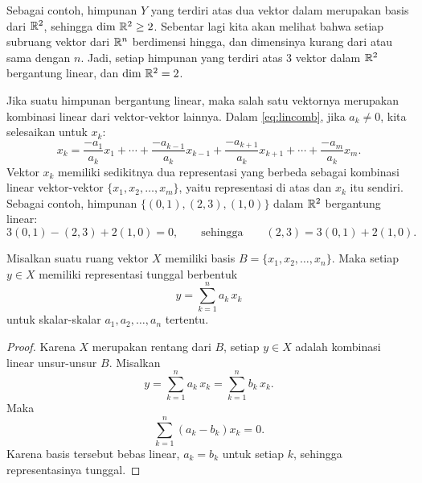 Sebagai contoh,
himpunan $Y$ yang terdiri atas dua vektor dalam
 merupakan basis dari ${\mathbb{R}}^2$, sehingga
$\dim \, {\mathbb{R}}^2 \geq 2$.
Sebentar lagi kita akan melihat bahwa setiap subruang vektor dari ${\mathbb{R}}^n$
berdimensi hingga, dan dimensinya kurang dari atau sama dengan $n$.
Jadi, setiap himpunan yang terdiri atas 3 vektor dalam ${\mathbb{R}}^2$ bergantung linear, dan
$\dim \, {\mathbb{R}}^2 = 2$.

Jika suatu himpunan bergantung linear, maka salah satu
vektornya merupakan kombinasi linear dari vektor-vektor lainnya.
Dalam \eqref{eq:lincomb},
jika $a_k \neq 0$, kita selesaikan untuk $x_k$:
\begin{equation*}
x_k = \frac{-a_1}{a_k} x_1 + \cdots + 
\frac{-a_{k-1}}{a_k} x_{k-1} +
\frac{-a_{k+1}}{a_k} x_{k+1} +
\cdots + 
\frac{-a_m}{a_k} x_m .
\end{equation*}
Vektor $x_k$ memiliki sedikitnya dua representasi yang berbeda
sebagai kombinasi linear vektor-vektor $\{ x_1,x_2,\ldots,x_m \}$, yaitu representasi di atas dan
$x_k$ itu sendiri. 
Sebagai contoh, himpunan $\bigl\{ (0,1), (2,3), (1,0) \bigr\}$ dalam ${\mathbb{R}}^2$ bergantung linear:
\begin{equation*}
3(0,1) - (2,3) + 2(1,0) = 0 ,
\qquad \text{sehingga} \qquad
(2,3) = 3(0,1) + 2(1,0) .
\end{equation*}

\begin{prop}
Misalkan suatu ruang vektor $X$ memiliki basis 
$B = \{ x_1, x_2, \ldots, x_n \}$.  Maka
setiap $y \in X$ memiliki representasi tunggal berbentuk
\begin{equation*}
y = \sum_{k=1}^n a_k \, x_k
\end{equation*}
untuk skalar-skalar $a_1, a_2, \ldots, a_n$ tertentu.
\end{prop}

\begin{proof}
Karena $X$ merupakan rentang dari $B$,
setiap $y \in X$ adalah kombinasi linear unsur-unsur $B$.
Misalkan
\begin{equation*}
y = \sum_{k=1}^n a_k \, x_k = \sum_{k=1}^n b_k \, x_k .
\end{equation*}
Maka
\begin{equation*}
\sum_{k=1}^n (a_k-b_k) x_k = 0 .
\end{equation*}
Karena basis tersebut bebas linear, $a_k = b_k$ untuk setiap $k$, sehingga
representasinya tunggal.
\end{proof}

